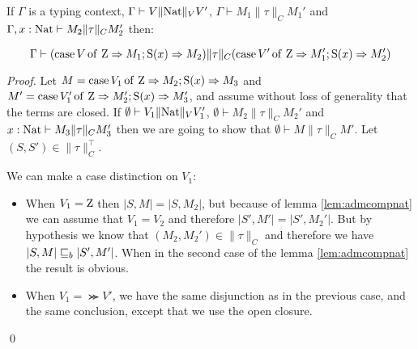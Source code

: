 \begin{alemma}
    If $\Gamma$ is a typing context, 
    $\Gamma \vdash V \| \textnormal{Nat} \|_V V'$,
    $\Gamma \vdash M_1 \| \tau \|_C M_1'$
    and $\Gamma, x:\textnormal{Nat} \vdash M_2 \| \tau \|_C M_2'$
    then:

    \begin{equation*}
        \Gamma \vdash (\operatorname{case} V \operatorname{of} \, \textnormal{Z} \Rightarrow M_1; \operatorname{S}(x) \Rightarrow M_2) \| \tau \|_C
            (\operatorname{case} V' \operatorname{of} \, \textnormal{Z} \Rightarrow M_1'; \operatorname{S}(x) \Rightarrow M_2')
    \end{equation*}
\end{alemma}
\begin{proof}
Let $M = \operatorname{case} V_1 \operatorname{of} \, \textnormal{Z} \Rightarrow M_2; \operatorname{S}(x) \Rightarrow M_3$ and $M' = \operatorname{case} V_1' \operatorname{of} \, \textnormal{Z} \Rightarrow M_2'; \operatorname{S}(x) \Rightarrow M_3'$,
and assume without loss of generality that the terms are closed. 
If $\emptyset \vdash V_1 \| \textnormal{Nat} \|_V V_1'$, 
$\emptyset \vdash M_2 \| \tau \|_C M_2'$
and $ x: \textnormal{Nat} \vdash M_3 \| \tau \|_C M_3'$ 
then we are going to show that $\emptyset \vdash M \| \tau \|_C M'$.
Let $(S,S') \in \| \tau \|_C^\top$.

We can make a case distinction on $V_1$:
\begin{itemize}
    \item When $V_1 = \textnormal{Z}$ then $|S,M| = |S,M_2|$,
        but because of lemma \ref{lem:admcompnat} 
        we can assume that $V_1 = V_2$ and therefore 
        $|S',M'| = |S', M_2'|$. But by hypothesis
        we know that $(M_2,M_2') \in \| \tau \|_C$ and therefore
        we have $| S, M| \sqsubseteq_b |S',M'|$. When in the second 
        case of the lemma \ref{lem:admcompnat} 
        the result is obvious.

    \item When $V_1 = \Succ V'$, we have the same 
        disjunction as in the previous case, and 
        the same conclusion, except that we use 
        the open closure.
\end{itemize}
\qed\end{proof}




